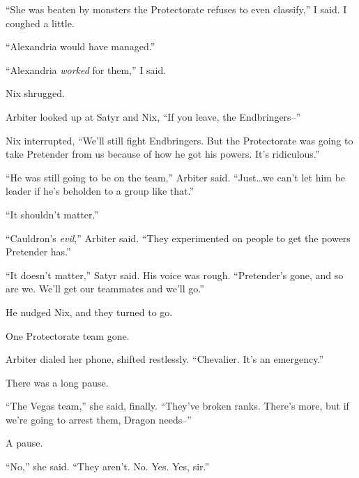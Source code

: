 ``She was beaten by monsters the Protectorate refuses to even classify,'' I said.  I coughed a little.



``Alexandria would have managed.''



``Alexandria \emph{worked} for them,'' I said.



Nix shrugged.



Arbiter looked up at Satyr and Nix, ``If you leave, the Endbringers--''



Nix interrupted, ``We'll still fight Endbringers.  But the Protectorate was going to take Pretender from us because of how he got his powers.  It's ridiculous.''



``He was still going to be on the team,'' Arbiter said.  ``Just\ldots we can't let him be leader if he's beholden to a group like that.''



``It shouldn't matter.''



``Cauldron's \emph{evil},'' Arbiter said.  ``They experimented on people to get the powers Pretender has.''



``It doesn't matter,'' Satyr said.  His voice was rough.  ``Pretender's gone, and so are we.  We'll get our teammates and we'll go.''



He nudged Nix, and they turned to go.



One Protectorate team gone.



Arbiter dialed her phone, shifted restlessly.  ``Chevalier.  It's an emergency.''



There was a long pause.



``The Vegas team,'' she said, finally.  ``They've broken ranks.  There's more, but if we're going to arrest them, Dragon needs--''



A pause.



``No,'' she said.  ``They aren't.  No.  Yes.  Yes, sir.''



